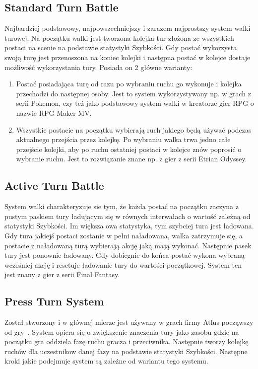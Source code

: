 \documentclass{SGGW-thesis}
\begin{document}
\subsection{Standard Turn Battle}
Najbardziej podstawowy, najpowszechniejszy i zarazem najprostszy system walki turowej. Na początku walki jest tworzona kolejka tur złożona ze wszystkich postaci na scenie na podstawie statystyki Szybkości.
Gdy postać wykorzysta swoją turę jest przenoszona na koniec kolejki i następna postać w kolejce dostaje możliwość wykorzystania tury. Posiada on 2 główne warianty:
\begin{enumerate}
  \item{Postać posiadająca turę od razu po wybraniu ruchu go wykonuje i kolejka przechodzi do następnej osoby. Jest to system wykorzystywany np. w grach z serii Pokemon, czy też jako podstawowy system walki w kreatorze gier RPG o nazwie RPG Maker MV.}
  \item{Wszystkie postacie na początku wybierają ruch jakiego będą używać podczas aktualnego przejścia przez kolejkę. Po wybraniu walka trwa jedno całe przejście kolejki, aby po ruchu ostatniej postaci w kolejce znów poprosić o wybranie ruchu. Jest to rozwiązanie znane np. z gier z serii Etrian Odyssey.}
\end{enumerate}
\subsection{Active Turn Battle}
System walki charakteryzuje sie tym, że każda postać na początku zaczyna z pustym paskiem tury ładującym się w równych interwałach o wartość zależną od statystyki Szybkości. Im większa owa statystyka, tym szybciej tura jest ładowana.
Gdy tura jakiejś postaci zostanie w pełni naładowana, walka zatrzymuje się, a postacie z naładowaną turą wybierają akcję jaką mają wykonać. Następnie pasek tury jest ponownie ładowany. Gdy dobiegnie do końca postać wykona wybraną wcześniej akcję i resetuje ładowanie tury do wartości początkowej.
System ten jest znany z gier z serii Final Fantasy.
\subsection{Press Turn System}
Został stworzony i w głównej mierze jest używany w grach firmy Atlus począwszy od gry~\cite{SMT3}. System opiera się o zwiększenie znaczenia tury jako zasobu gdzie na początku gra oddziela fazę ruchu gracza i przeciwnika. Następnie tworzy kolejkę ruchów dla uczestnikow danej fazy na podstawie statystyki Szybkości.
Następne kroki jakie podejmuje system są zależne od wariantu tego systemu. 
\end{document}
